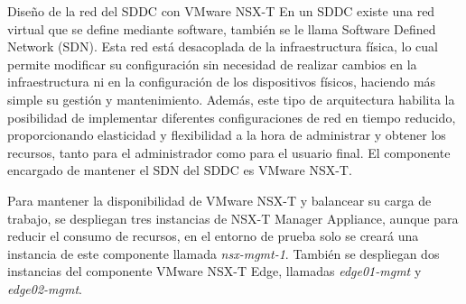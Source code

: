 \begin{subsubsection}{Diseño de la red del SDDC con VMware NSX-T}
    En un SDDC existe una red virtual que se define mediante software, también se le llama Software Defined Network (SDN). Esta red está desacoplada de la infraestructura física, lo cual permite modificar su configuración sin necesidad de realizar cambios en la infraestructura ni en la configuración de los dispositivos físicos, haciendo más simple su gestión y mantenimiento. Además, este tipo de arquitectura habilita la posibilidad de implementar diferentes configuraciones de red en tiempo reducido, proporcionando elasticidad y flexibilidad a la hora de administrar y obtener los recursos, tanto para el administrador como para el usuario final. 
    El componente encargado de mantener el SDN del SDDC es VMware NSX-T.

    Para mantener la disponibilidad de VMware NSX-T y balancear su carga de trabajo, se despliegan tres instancias de NSX-T Manager Appliance, aunque para reducir el consumo de recursos, en el entorno de prueba solo se creará una instancia de este componente llamada \textit{nsx-mgmt-1}. También se despliegan dos instancias del componente VMware NSX-T Edge, llamadas \textit{edge01-mgmt} y \textit{edge02-mgmt}.


\end{subsubsection}
